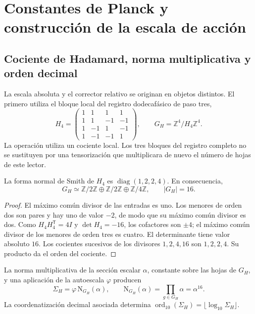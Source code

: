 \section{Constantes de Planck y construcción de la escala de acción}
\label{sec:action}
\subsection{Cociente de Hadamard, norma multiplicativa y orden decimal}

La escala absoluta y el corrector relativo se originan en objetos
distintos. El primero utiliza el bloque local del registro dodecafásico
de paso tres,
\begin{equation}
 H_4=\begin{pmatrix}
 1&1&1&1\\1&1&-1&-1\\1&-1&1&-1\\1&-1&-1&1
 \end{pmatrix},\qquad
 G_H=\mathbb Z^4/H_4\mathbb Z^4.
 \label{eq:el-h4}
\end{equation}
La operación utiliza un cociente local. Los tres bloques del registro
completo no se sustituyen por una tensorización que multiplicara de
nuevo el número de hojas de este lector.

\begin{lemma}
La forma normal de Smith de \(H_4\) es
\(\operatorname{diag}(1,2,2,4)\). En consecuencia,
\[
 G_H\simeq\mathbb Z/2\mathbb Z\oplus\mathbb Z/2\mathbb Z
 \oplus\mathbb Z/4\mathbb Z,\qquad |G_H|=16.
\]
\end{lemma}
\begin{proof}
El máximo común divisor de las entradas es uno. Los menores de orden dos
son pares y hay uno de valor \(-2\), de modo que su máximo común divisor
es dos. Como \(H_4H_4^{\mathsf T}=4I\) y \(\det H_4=-16\), los
cofactores son \(\pm4\); el máximo común divisor de los menores de orden
tres es cuatro. El determinante tiene valor absoluto \(16\). Los cocientes sucesivos de los divisores
\(1,2,4,16\) son \(1,2,2,4\). Su producto da el orden del cociente.
\end{proof}

\begin{definition}
La norma multiplicativa de la sección escalar \(\alpha\), constante
sobre las hojas de \(G_H\), y una aplicación de la autoescala
\(\varphi\) producen
\begin{equation}
 \Sigma_H=\varphi\,\mathrm N_{G_H}(\alpha),\qquad
 \mathrm N_{G_H}(\alpha)=\prod_{g\in G_H}\alpha=\alpha^{16}.
 \label{eq:el-lector-determinantal}
\end{equation}
La coordenatización decimal asociada determina
\(\operatorname{ord}_{10}(\Sigma_H)=\lfloor\log_{10}\Sigma_H\rfloor\).
\end{definition}

